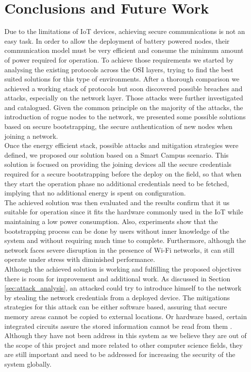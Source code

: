 
\chapter{Conclusions and Future Work}
\label{chapter:conclusion}
Due to the limitations of \gls{IoT} devices, achieving secure communications is not an easy task. In order to allow the deployment of battery powered nodes, their communication model must be very efficient and consume the minimum amount of power required for operation. To achieve those requirements we started by analysing the existing protocols across the OSI layers, trying to find the best suited solutions for this type of environments. After a thorough comparison we achieved a working stack of protocols but soon discovered possible breaches and attacks, especially on the network layer. Those attacks were further investigated and catalogued. Given the common principle on the majority of the attacks, the introduction of rogue nodes to the network, we presented some possible solutions based on secure bootstrapping, the secure authentication of new nodes when joining a network.\\
Once the energy efficient stack, possible attacks and mitigation strategies were defined, we proposed our solution based on a Smart Campus scenario. This solution is focused on providing the joining devices all the secure credentials required for a secure bootstrapping before the deploy on the field, so that when they start the operation phase no additional credentials need to be fetched, implying that no additional energy is spent on configuration.\\
The achieved solution was then evaluated and the results confirm that it us suitable for operation since it fits the hardware commonly used in the \gls{IoT} while maintaining a low power consumption. Also, experiments show that the bootstrapping process can be done by users without inner knowledge of the system and without requiring much time to complete. Furthermore, although the network faces severe disruption in the presence of Wi-Fi networks, it can still operate under stress with diminished performance.\\
Although the achieved solution is working and fulfilling the proposed objectives there is room for improvement and additional work. As discussed in Section \ref{sec:attack_analysis}, an attacked could try to introduce himself to the network by stealing the network credentials from a deployed device. The mitigations strategies for this attack can be either software based,  assuring that secure memory areas cannot be copied to external locations. Or hardware based, certain integrated circuits assure the stored information cannot be read from them \cite{Lesjak2014}. Although they have not been address in this system as we believe they are out of the scope of this project and more related to other computer science fields, they are still important and need to be addressed for increasing the security of the system globally.\\


